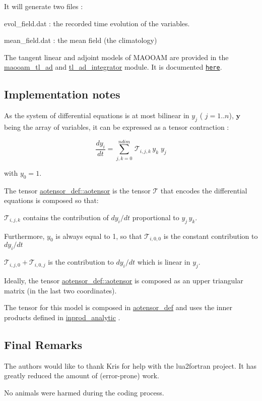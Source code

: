 It will generate two files \-:
\begin{DoxyItemize}
\item evol\-\_\-field.\-dat \-: the recorded time evolution of the variables.
\item mean\-\_\-field.\-dat \-: the mean field (the climatology)
\end{DoxyItemize}

The tangent linear and adjoint models of M\-A\-O\-O\-A\-M are provided in the \hyperlink{classmaooam__tl__ad}{maooam\-\_\-tl\-\_\-ad} and \hyperlink{classtl__ad__integrator}{tl\-\_\-ad\-\_\-integrator} module. It is documented \href{./md_README_TL_AD.html}{\tt here}. 



\subsection*{Implementation notes}

As the system of differential equations is at most bilinear in $y_j$ ( $j=1..n$), $\boldsymbol{y}$ being the array of variables, it can be expressed as a tensor contraction \-:

\[ \frac{d y_i}{dt} = \sum_{j,k=0}^{ndim} \, \mathcal{T}_{i,j,k} \, y_k \; y_j \]

with $y_0 = 1$.

The tensor \hyperlink{classaotensor__def_a0dc43bc9294a18f2fe57b67489f1702f}{aotensor\-\_\-def\-::aotensor} is the tensor $\mathcal{T}$ that encodes the differential equations is composed so that\-:


\begin{DoxyItemize}
\item $\mathcal{T}_{i,j,k}$ contains the contribution of $dy_i/dt$ proportional to $ y_j \, y_k$.
\item Furthermore, $y_0$ is always equal to 1, so that $\mathcal{T}_{i,0,0}$ is the constant contribution to $dy_i/dt$
\item $\mathcal{T}_{i,j,0} + \mathcal{T}_{i,0,j}$ is the contribution to $dy_i/dt$ which is linear in $y_j$.
\end{DoxyItemize}

Ideally, the tensor \hyperlink{classaotensor__def_a0dc43bc9294a18f2fe57b67489f1702f}{aotensor\-\_\-def\-::aotensor} is composed as an upper triangular matrix (in the last two coordinates).

The tensor for this model is composed in \hyperlink{classaotensor__def}{aotensor\-\_\-def} and uses the inner products defined in \hyperlink{classinprod__analytic}{inprod\-\_\-analytic} . 



\subsection*{Final Remarks}

The authors would like to thank Kris for help with the lua2fortran project. It has greatly reduced the amount of (error-\/prone) work.

No animals were harmed during the coding process. 
